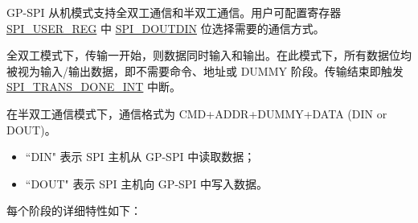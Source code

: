 \documentclass[main\_\_CN.tex]{subfiles}
\begin{document}
GP-SPI 从机模式支持全双工通信和半双工通信。用户可配置寄存器  \hyperref[regdesc:SPIUSERREG]{SPI\_USER\_REG} 中  \hyperref[fielddesc:SPIDOUTDIN]{SPI\_DOUTDIN} 位选择需要的通信方式。

全双工模式下，传输一开始，则数据同时输入和输出。在此模式下，所有数据位均被视为输入/输出数据，即不需要命令、地址或 DUMMY 阶段。传输结束即触发  \hyperref[int:SPITRANSDONEINT]{SPI\_TRANS\_DONE\_INT} 中断。

在半双工通信模式下，通信格式为 CMD+ADDR+DUMMY+DATA (DIN or DOUT)。
\begin{itemize}
    \item ``DIN" 表示 SPI 主机从 GP-SPI 中读取数据；
    \item ``DOUT" 表示 SPI 主机向 GP-SPI 中写入数据。
\end{itemize}

每个阶段的详细特性如下：
\end{document}
